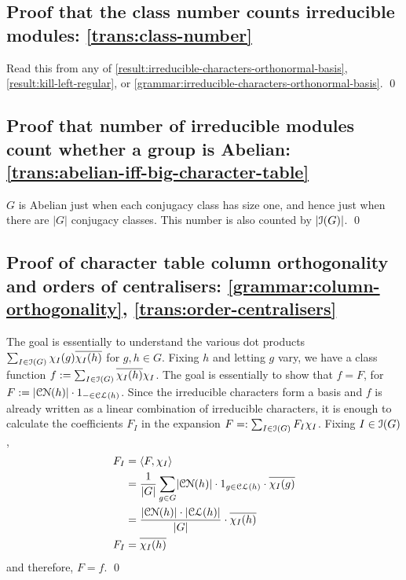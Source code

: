 \subsection{Proof that the class number counts irreducible modules: \ref{trans:class-number}} %
\pan Read this from any of \ref{result:irreducible-characters-orthonormal-basis}, \ref{result:kill-left-regular}, or \ref{grammar:irreducible-characters-orthonormal-basis}. \qed

\subsection{Proof that number of irreducible modules count whether a group is Abelian: \ref{trans:abelian-iff-big-character-table}} %
\pan $G$ is Abelian just when each conjugacy class has size one, and hence just when there are $\lvert G \rvert$ conjugacy classes. This number is also counted by $\lvert \operatorname{\mathcal{I}}(G) \rvert$. \qed

\subsection{Proof of character table column orthogonality and orders of centralisers: \ref{grammar:column-orthogonality}, \ref{trans:order-centralisers}} %
\pan The goal is essentially to understand the various dot products $\sum_{I \in \operatorname{\mathcal{I}}(G)} \chi_I (g) \overline{\chi_I (h)}$ for $g, h \in G$. Fixing $h$ and letting $g$ vary, we have a class function $f := \sum_{I \in \operatorname{\mathcal{I}}(G)} \overline{\chi_I (h)} \chi_I$. The goal is essentially to show that $f = F$, for $F := \lvert \operatorname{\mathcal{CN}} (h) \rvert \cdot 1_{{-} \in \operatorname{\mathcal{CL}}(h)}$. Since the irreducible characters form a basis and $f$ is already written as a linear combination of irreducible characters, it is enough to calculate the coefficients $F_I$ in the expansion $F =: \sum_{I \in \operatorname{\mathcal{I}}(G)} F_I \chi_I$. Fixing $I \in \operatorname{\mathcal{I}}(G)$,
\begin{align*}
  F_I
  &= \langle F, \chi_I \rangle
  \\
  &= \frac{1}{\lvert G \rvert} \sum_{g \in G}
    \lvert \operatorname{\mathcal{CN}} (h) \rvert \cdot 1_{g \in \operatorname{\mathcal{CL}}(h)}
    \cdot \overline{\chi_I (g)}
  \\
  &= \frac{\lvert \operatorname{\mathcal{CN}} (h) \rvert \cdot \lvert \operatorname{\mathcal{CL}}(h) \rvert}{\lvert G \rvert}
    \cdot \overline{\chi_I (h)}
  \\
  F_I
  &= \overline{\chi_I (h)}
\end{align*}
and therefore, $F = f$. \qed

